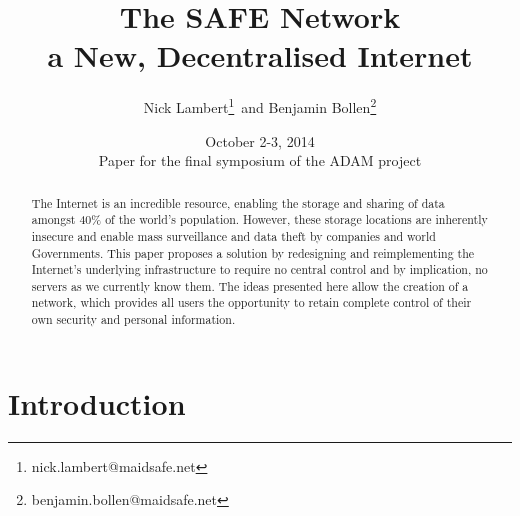 \documentclass[twocolumn,english]{article}
\begin{document}
\title{The SAFE Network\\ a New, Decentralised Internet}
\date{October 2-3, 2014\\ Paper for the final symposium of the ADAM project}
\author{Nick Lambert\footnote{nick.lambert@maidsafe.net}\, and Benjamin Bollen\footnote{benjamin.bollen@maidsafe.net}}
\maketitle

\begin{abstract}
The Internet is an incredible resource, enabling the storage and sharing
of data amongst 40\% of the world\textquoteright s population. However,
these storage locations are inherently insecure and enable mass surveillance
and data theft by companies and world Governments. This paper proposes
a solution by redesigning and reimplementing the Internet\textquoteright s
underlying infrastructure to require no central control and by implication,
no servers as we currently know them. The ideas presented here allow
the creation of a network, which provides all users the opportunity
to retain complete control of their own security and personal information.
\end{abstract}

\section{Introduction}
\end{document}
